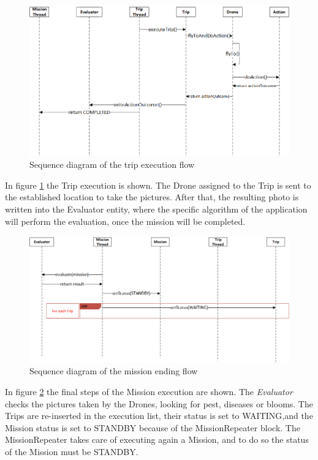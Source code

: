 \newpage

\begin{figure}[h!]
  \centering
  \includegraphics[width=\linewidth]{pictures/Alfalfa_Sequence_TripExecution.png}
  \caption{Sequence diagram of the trip execution flow}
  \label{fig:alfalfaSequence3}
\end{figure}

In figure \ref{fig:alfalfaSequence3} the Trip execution is shown.
The Drone assigned to the Trip is sent to the established location to take the pictures.
After that, the resulting photo is written into the Evaluator entity, where the specific algorithm of the application will perform the evaluation, once the mission will be completed.
\\

\begin{figure}[h!]
  \centering
  \includegraphics[width=\linewidth]{pictures/Alfalfa_Sequence_MissionEnd.png}
  \caption{Sequence diagram of the mission ending flow}
  \label{fig:alfalfaSequence4}
\end{figure}

In figure \ref{fig:alfalfaSequence4} the final steps of the Mission execution are shown.
The \textit{Evaluator} checks the pictures taken by the Drones, looking for pest, diseases or blooms.
The Trips are re-inserted in the execution list, their status is set to WAITING,and the Mission status is set to STANDBY because of the MissionRepeater block.
The MissionRepeater takes care of executing again a Mission, and to do so the status of the Mission must be STANDBY.
\\

